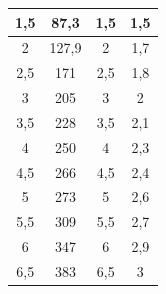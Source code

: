 \documentclass[a4paper,14pt]{extreport}
\begin{document}
\begin{table}[!h]
\begin{subtable}{.5\linewidth}
\begin{tabular}{|c|c|c|c|}
1,5         & 87,3          & 1,5          & 1,5            \\ \hline
2           & 127,9         & 2            & 1,7            \\ \hline
2,5         & 171           & 2,5          & 1,8            \\ \hline
3           & 205           & 3            & 2              \\ \hline
3,5         & 228           & 3,5          & 2,1            \\ \hline
4           & 250           & 4            & 2,3            \\ \hline
4,5         & 266           & 4,5          & 2,4            \\ \hline
5           & 273           & 5            & 2,6            \\ \hline
5,5         & 309           & 5,5          & 2,7            \\ \hline
6           & 347           & 6            & 2,9            \\ \hline
6,5         & 383           & 6,5          & 3              \\ \hline
\end{tabular}
\end{subtable} 

\end{table}
\end{document}

